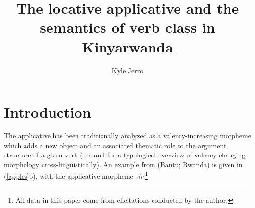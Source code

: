 \documentclass[output=paper]{langsci/langscibook}
\title{The locative applicative and the semantics of verb class in Kinyarwanda}
\author{%
 Kyle Jerro \affiliation{University of Texas at Austin } 
}
\begin{document}
\newcommand{\p}{\leavevmode\llap{(}}
\newcommand{\odd}{\leavevmode\llap{\#}}
\newcommand{\odder}{\leavevmode\llap{?\#}}
\newcommand{\q}{\leavevmode\llap{?}}
\newcommand{\hm}{\footnotesize\leavevmode\llap{?(?)}}
\newcommand{\qq}{\leavevmode\llap{??}}
\newcommand{\bad}{\leavevmode\llap{*}}
\newcommand{\huh}{\leavevmode\llap{?*}}

\def\emdash{\hbox{~--\ }}
\def\endash{\hbox{--}}




 
 
 



 
\section{Introduction}%

 The applicative has been traditionally analyzed as a valency-increasing morpheme which adds a new object and an associated thematic role to the argument structure of a given verb (see \citealt{dixon:1997} and \citealt{peterson:2007} for a typological overview of va\-lency-chang\-ing morphology cross-linguistically). An example from  (Ban\-tu; Rwan\-da) is given in (\ref{apples}b), with the applicative morpheme \emph{-ir}:\footnote{All  data in this paper come from elicitations conducted by the author.}
\end{document}
